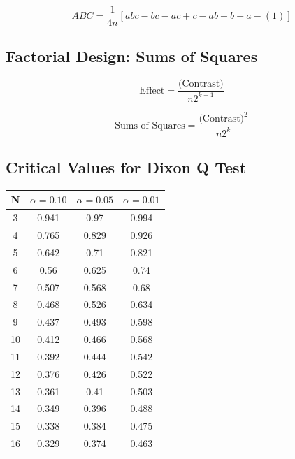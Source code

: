 \documentclass[a4paper,12pt]{article}
\begin{document}
\[ABC = \frac{1}{4n} \left[ abc - bc - ac + c - ab + b +  a - (1) \right] \]

\bigskip

\subsection*{Factorial Design: Sums of Squares}

\[\mbox{Effect} =  \frac{\mbox{(Contrast)}}{n2^{k-1}}\]

\[\mbox{Sums of Squares} =  \frac{\mbox{(Contrast)}^2}{n2^k}\]

\newpage
\Large{
\subsection*{Critical Values for Dixon Q Test}
\begin{center}
	\begin{tabular}{|c|c|c|c|}
		\hline  N  & $\alpha=0.10$  & $\alpha=0.05$  & $\alpha=0.01$  \\ \hline
		3  & 0.941 & 0.97  & 0.994 \\ \hline
		4  & 0.765 & 0.829 & 0.926 \\ \hline
		5  & 0.642 & 0.71  & 0.821 \\ \hline
		6  & 0.56  & 0.625 & 0.74  \\ \hline
		7  & 0.507 & 0.568 & 0.68  \\ \hline
		8  & 0.468 & 0.526 & 0.634 \\ \hline
		9  & 0.437 & 0.493 & 0.598 \\ \hline
		10 & 0.412 & 0.466 & 0.568 \\ \hline
		11 & 0.392 & 0.444 & 0.542 \\ \hline
		12 & 0.376 & 0.426 & 0.522 \\ \hline
		13 & 0.361 & 0.41  & 0.503 \\ \hline
		14 & 0.349 & 0.396 & 0.488 \\ \hline
		15 & 0.338 & 0.384 & 0.475 \\ \hline
		16 & 0.329 & 0.374 & 0.463 \\ \hline
	\end{tabular} 
\end{center}
}
\newpage
\end{document}
